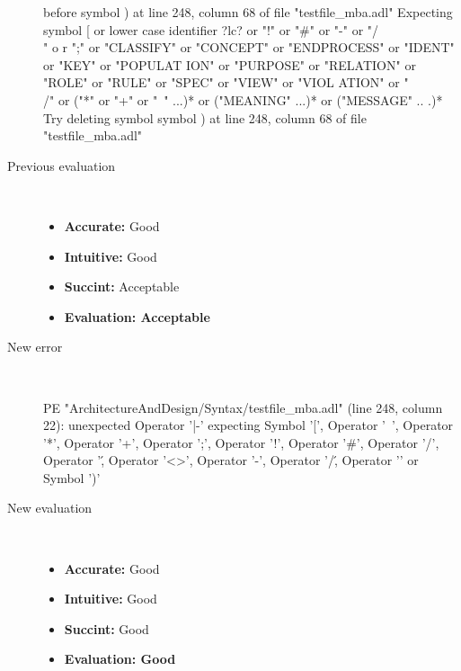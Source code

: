 \begin{description}
\begin{haskell}
before symbol ) at line 248, column 68 of file "testfile_mba.adl"
Expecting symbol [ or lower case identifier ?lc? or "!" or "#" or "-" or "/\\" o
r ";" or "CLASSIFY" or "CONCEPT" or "ENDPROCESS" or "IDENT" or "KEY" or "POPULAT
ION" or "PURPOSE" or "RELATION" or "ROLE" or "RULE" or "SPEC" or "VIEW" or "VIOL
ATION" or "\\/" or ("*" or "+" or "~" ...)* or ("MEANING" ...)* or ("MESSAGE" ..
.)*
Try deleting symbol symbol ) at line 248, column 68 of file "testfile_mba.adl"
\end{haskell}
  \item[Previous evaluation]~\\
    \begin{itemize}
    \item \textbf{Accurate:} Good
    \item \textbf{Intuitive:} Good
    \item \textbf{Succint:} Acceptable
    \item \textbf{Evaluation: Acceptable}
    \end{itemize}
  \item[New error]~\\
\begin{haskell}
PE "ArchitectureAndDesign/Syntax/testfile_mba.adl" (line 248, column 22):
unexpected Operator '|-'
expecting Symbol '[', Operator '~', Operator '*', Operator '+', Operator ';', Operator '!', Operator '#', Operator '/', Operator '\', Operator '<>', Operator '-', Operator '/\', Operator '\/' or Symbol ')'\end{haskell}
  \item[New evaluation]~\\
    \begin{itemize}
    \item \textbf{Accurate:} Good
    \item \textbf{Intuitive:} Good
    \item \textbf{Succint:} Good
    \item \textbf{Evaluation: Good
}
    \end{itemize}
  \end{description}

\hrulefill

